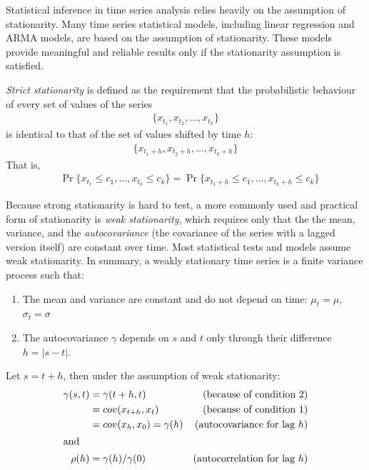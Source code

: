 Statistical inference in time series analysis relies heavily on the assumption of stationarity. Many time series statistical models, including linear regression and ARMA models, are based on the assumption of stationarity. These models provide meaningful and reliable results only if the stationarity assumption is satisfied. 

\emph{Strict stationarity} is defined as the requirement that the probabilistic behaviour of every set of values of the series
\begin{align*}\{x_{t_1}, x_{t_2}, \ldots, x_{t_k} \} \end{align*}
\noindent is identical to that of the set of values shifted by time $h$:
\begin{align*}
\{x_{t_1+h}, x_{t_2+h}, \ldots, x_{t_k + h} \}
\end{align*}
\noindent That is,
\begin{align*}
&\Pr \{ x_{t_1} \leq c_1, \ldots, x_{t_k} \leq c_k \} = \Pr \{ x_{t_1+h}\leq c_1, \ldots , x_{t_k+h} \leq c_k \}
\end{align*}

Because strong stationarity is hard to test, a more commonly used and practical form of stationarity is \emph{weak stationarity}, which requires only that the the mean, variance, and the \emph{autocovariance} (the covariance of the series with a lagged version itself) are constant over time. Most statistical tests and models assume weak stationarity. In summary, a weakly stationary time series is a finite variance process such that:

\begin{enumerate}
\item The mean and variance are constant and do not depend on time: $\mu_t = \mu$, $\sigma_t = \sigma$
\item The autocovariance $\gamma$ depends on $s$ and $t$ only through their difference $h=|s-t|$.
\end{enumerate}

Let $s = t + h$, then under the assumption of weak stationarity:
\begin{align*}
\gamma(s, t) &= \gamma(t+h, t)  &\text{(because of condition 2)} \\ 
             &= cov(x_{t+h}, x_t)  &\text{(because of condition 1)} \\ 
             &= cov(x_h, x_0) = \gamma(h)  &\text{(autocovariance for lag $h$)} \\
\intertext{and}
\rho(h) &= \gamma(h) / \gamma(0) &\text{(autocorrelation for lag $h$)}
\end{align*}

